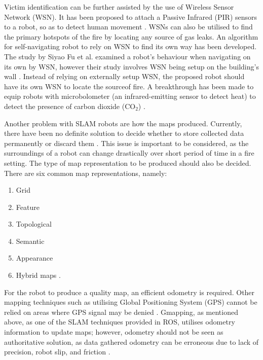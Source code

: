\documentclass[12pt]{report}
\begin{document}
\vspace{1em}
Victim identification can be further assisted by the use of Wireless Sensor Network (WSN). It has been proposed to attach a Passive Infrared (PIR) sensors to a robot, so as to detect human movement \cite{Tuna}. WSNs can also be utilised to find the primary hotspots of the fire by locating any source of gas leaks. An algorithm for self-navigating robot to rely on WSN to find its own way has been developed. The study by Siyao Fu et al. examined a robot’s behaviour when navigating on its own by WSN, however their study involves WSN being setup on the building’s wall \cite{Fu}. Instead of relying on externally setup WSN, the proposed robot should have its own WSN to locate the sourceof fire. A breakthrough has been made to equip robots with microbolometer (an infrared-emitting sensor to detect heat) to detect the presence of carbon dioxide (CO$_2$) \cite{Barber}.\par
\vspace{1em}
Another problem with SLAM robots are how the maps produced. Currently, there have been no definite solution to decide whether to store collected data permanently or discard them \cite{Cadena}. This issue is important to be considered, as the surroundings of a robot can change drastically over short period of time in a fire setting. The type of map representation to be produced should also be decided. There are six common map representations, namely:
\begin{enumerate}
    \item Grid
    \item Feature
    \item Topological
    \item Semantic
    \item Appearance
    \item Hybrid maps \cite{Saeedi}.
\end{enumerate}\par
\vspace{1em}
For the robot to produce a quality map, an efficient odometry is required. Other mapping techniques such as utilising Global Positioning System (GPS) cannot be relied on areas where GPS signal may be denied \cite{Wu}. Gmapping, as mentioned above, as one of the SLAM techniques provided in ROS, utilises odometry information to update maps; however, odometry should not be seen as authoritative solution, as data gathered odometry can be erroneous due to lack of precision, robot slip, and friction \cite{Guimaraes}.\par
\end{document}
